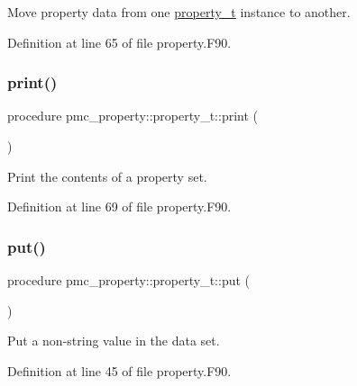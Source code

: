 Move property data from one \mbox{\hyperlink{structpmc__property_1_1property__t}{property\+\_\+t}} instance to another. 



Definition at line 65 of file property.\+F90.

\mbox{\label{structpmc__property_1_1property__t_af5f4f2c17a99e7bbff86bb10bf7ce938}} 
\subsubsection{\texorpdfstring{print()}{print()}}
{\footnotesize\ttfamily procedure pmc\+\_\+property\+::property\+\_\+t\+::print (\begin{DoxyParamCaption}{ }\end{DoxyParamCaption})\hspace{0.3cm}{\ttfamily [private]}}



Print the contents of a property set. 



Definition at line 69 of file property.\+F90.

\mbox{\label{structpmc__property_1_1property__t_a37ae9c5fe401b8c73daccfbb7c864d5d}} 
\subsubsection{\texorpdfstring{put()}{put()}}
{\footnotesize\ttfamily procedure pmc\+\_\+property\+::property\+\_\+t\+::put (\begin{DoxyParamCaption}{ }\end{DoxyParamCaption})\hspace{0.3cm}{\ttfamily [private]}}



Put a non-\/string value in the data set. 



Definition at line 45 of file property.\+F90.

\mbox{\label{structpmc__property_1_1property__t_a5fbfb7bb66aa477a7527a1b9e0504912}} 
